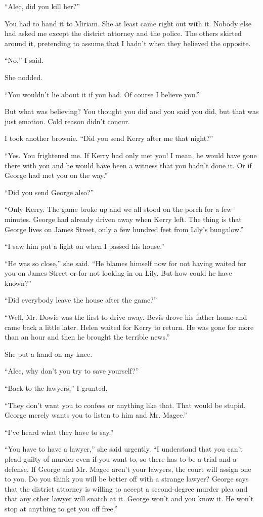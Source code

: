 \documentclass{novel}
\begin{document}
“Alec, did you kill her?”

\scenestars

You had to hand it to Miriam. She at least came right out with it. Nobody else had asked me except the district attorney and the police. The others skirted around it, pretending to assume that I hadn’t when they believed the opposite.

“No,” I said.

She nodded. 

“You wouldn’t lie about it if you had. Of course I believe you.” 

But what was believing? You thought you did and you said you did, but that was just emotion. Cold reason didn’t concur.

I took another brownie. “Did you send Kerry after me that night?”

“Yes. You frightened me. If Kerry had only met you! I mean, he would have gone there with you and he would have been a witness that you hadn’t done it. Or if George had met you on the way.”

“Did you send George also?”

“Only Kerry. The game broke up and we all stood on the porch for a few minutes. George had already driven away when Kerry left. The thing is that George lives on James Street, only a few hundred feet from Lily’s bungalow.”

“I saw him put a light on when I passed his house.”

“He was so close,” she said. “He blames himself now for not having waited for you on James Street or for not looking in on Lily. But how could he have known?”

“Did everybody leave the house after the game?”

“Well, Mr. Dowie was the first to drive away. Bevis drove his father home and came back a little later. Helen waited for Kerry to return. He was gone for more than an hour and then he brought the terrible news.” 

She put a hand on my knee. 

“Alec, why don’t you try to save yourself?”

“Back to the lawyers,” I grunted.

“They don’t want you to confess or anything like that. That would be stupid. George merely wants you to listen to him and Mr. Magee.”

“I’ve heard what they have to say.”

“You have to have a lawyer,” she said urgently. “I understand that you can’t plead guilty of murder even if you want to, so there has to be a trial and a defense. If George and Mr. Magee aren’t your lawyers, the court will assign one to you. Do you think you will be better off with a strange lawyer? George says that the district attorney is willing to accept a second-degree murder plea and that any other lawyer will snatch at it. George won’t and you know it. He won’t stop at anything to get you off free.”
\end{document}
